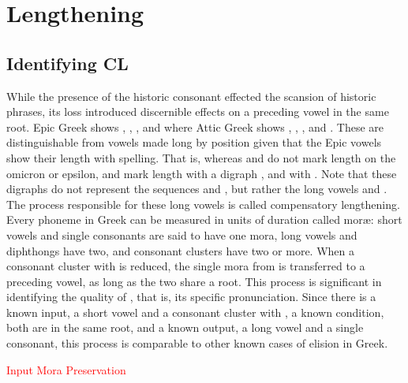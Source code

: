 \section{Lengthening}\label{sec:Lengthening}

\subsection{Identifying CL}
 While the presence of the historic consonant \greek{*\w} effected the scansion of historic phrases, its loss introduced discernible effects on a preceding vowel in the same root. Epic Greek shows , , , and  where Attic Greek shows , , , and . These are distinguishable from vowels made long by position given that the Epic vowels show their length with spelling. That is, whereas  and  do not mark length on the omicron or epsilon,  and  mark length with a digraph , and  with . Note that these digraphs do not represent the sequences  and , but rather the long vowels  and . The process responsible for these long vowels is called compensatory lengthening. Every phoneme in Greek can be measured in units of duration called mor\ae: short vowels and single consonants are said to have one mora, long vowels and diphthongs have two, and consonant clusters have two or more. When a consonant cluster with \greek{*\w} is reduced, the single mora from \greek{*\w} is transferred to a preceding vowel, as long as the two share a root. This process is significant in identifying the quality of \greek{*\w}, that is, its specific pronunciation. Since there is a known input, a short vowel and a consonant cluster with \greek{*\w},  a known condition, both are in the same root, and a known output, a long vowel and a single consonant, this process is comparable to other known cases of elision in Greek.

\noindent\textcolor{red}{Input Mora Preservation}

